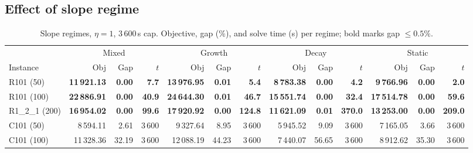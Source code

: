 \documentclass[11pt]{article}
\let\originalsubsection\subsection
\renewcommand{\subsection}{\FloatBarrier\originalsubsection}
\begin{document}


\subsection{Effect of slope regime}\label{subsec:slope-effect}


\begin{table}[H]
\centering\scriptsize
\setlength{\tabcolsep}{3pt}
\caption{Slope regimes, $\eta = 1$, $3\,600$\,s cap. Objective, gap (\%), and solve time (s) per regime; bold marks gap $\le 0.5\%$.}\label{tab:slope-effect}
\begin{tabular}{l rrr rrr rrr rrr}
\toprule
& \multicolumn{3}{c}{Mixed} & \multicolumn{3}{c}{Growth} & \multicolumn{3}{c}{Decay} & \multicolumn{3}{c}{Static} \\
\cmidrule(lr){2-4}\cmidrule(lr){5-7}\cmidrule(lr){8-10}\cmidrule(lr){11-13}
Instance & Obj & Gap & $t$ & Obj & Gap & $t$ & Obj & Gap & $t$ & Obj & Gap & $t$ \\
\midrule
R101 (50) & \textbf{11\,921.13} & \textbf{0.00} & \textbf{7.7} & \textbf{13\,976.95} & \textbf{0.01} & \textbf{5.4} & \textbf{8\,783.38} & \textbf{0.00} & \textbf{4.2} & \textbf{9\,766.96} & \textbf{0.00} & \textbf{2.0} \\
R101 (100) & \textbf{22\,886.91} & \textbf{0.00} & \textbf{40.9} & \textbf{24\,644.30} & \textbf{0.01} & \textbf{46.7} & \textbf{15\,551.74} & \textbf{0.00} & \textbf{32.4} & \textbf{17\,514.78} & \textbf{0.00} & \textbf{59.6} \\
R1\_2\_1 (200) & \textbf{16\,954.02} & \textbf{0.00} & \textbf{99.6} & \textbf{17\,920.92} & \textbf{0.00} & \textbf{124.8} & \textbf{11\,621.09} & \textbf{0.01} & \textbf{370.0} & \textbf{13\,253.00} & \textbf{0.00} & \textbf{209.0} \\
\midrule
C101 (50) & 8\,594.11 & 2.61 & 3\,600 & 9\,327.64 & 8.95 & 3\,600 & 5\,945.52 & 9.09 & 3\,600 & 7\,165.05 & 3.66 & 3\,600 \\
C101 (100) & 11\,328.36 & 32.19 & 3\,600 & 12\,088.19 & 44.23 & 3\,600 & 7\,440.07 & 56.65 & 3\,600 & 8\,912.62 & 35.30 & 3\,600 \\

\end{tabular}
\end{table}
\end{document}

